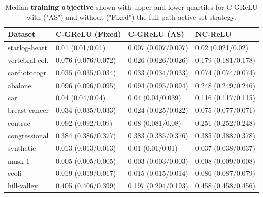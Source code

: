 \begin{table}
	\centering
	\begin{tabular}{llll} \toprule
		\textbf{Dataset} & \textbf{C-GReLU (Fixed)} & \textbf{C-GReLU (AS) } & \textbf{NC-ReLU}    \\ \midrule
		statlog-heart    & 0.01 (0.01/0.01)         & 0.007 (0.007/0.007)    & 0.02 (0.021/0.02)   \\
		vertebral-col.   & 0.076 (0.076/0.072)      & 0.026 (0.026/0.026)    & 0.179 (0.181/0.178) \\
		cardiotocogr.    & 0.035 (0.035/0.034)      & 0.033 (0.034/0.033)    & 0.074 (0.074/0.074) \\
		abalone          & 0.096 (0.096/0.095)      & 0.094 (0.095/0.094)    & 0.248 (0.249/0.246) \\
		car              & 0.04 (0.04/0.04)         & 0.04 (0.04/0.039)      & 0.116 (0.117/0.115) \\
		breast-cancer    & 0.034 (0.035/0.033)      & 0.024 (0.025/0.022)    & 0.075 (0.077/0.071) \\
		contrac          & 0.092 (0.092/0.09)       & 0.08 (0.081/0.08)      & 0.251 (0.252/0.248) \\
		congressional    & 0.384 (0.386/0.377)      & 0.383 (0.385/0.376)    & 0.385 (0.388/0.378) \\
		synthetic        & 0.013 (0.013/0.013)      & 0.01 (0.01/0.01)       & 0.037 (0.038/0.037) \\
		musk-1           & 0.005 (0.005/0.005)      & 0.003 (0.003/0.003)    & 0.008 (0.009/0.008) \\
		ecoli            & 0.019 (0.019/0.017)      & 0.015 (0.015/0.014)    & 0.086 (0.087/0.079) \\
		hill-valley      & 0.405 (0.406/0.399)      & 0.197 (0.204/0.193)    & 0.458 (0.458/0.456) \\ \bottomrule
	\end{tabular}
	\caption{Median \textbf{training objective} shown with upper and lower quartiles for C-GReLU with ("AS") and without ("Fixed") the full path active set strategy.}%
	\label{table:active-set-gated-obj}
\end{table}

